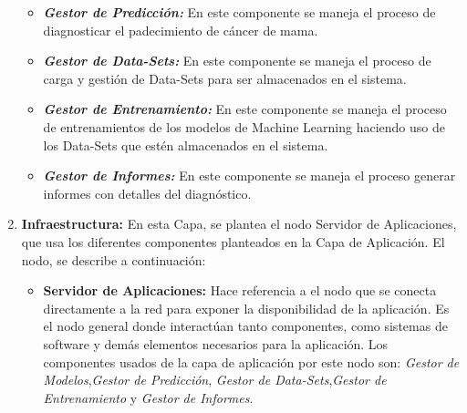\begin{enumerate}[label=\textbf{\arabic*})]
\begin{itemize}
	\item  \textbf{\textit{Gestor de Predicción:}} En este componente se maneja el proceso de diagnosticar el padecimiento de cáncer de mama.
	
	\item  \textbf{\textit{Gestor de Data-Sets:}} En este componente se maneja el proceso de carga  y gestión de Data-Sets para ser almacenados en el sistema.
	
	\item  \textbf{\textit{Gestor de Entrenamiento:}} En este componente se maneja el proceso de entrenamientos de los modelos de Machine Learning haciendo uso de los Data-Sets  que estén almacenados en el sistema.
	
	\item  \textbf{\textit{Gestor de Informes:}} En este componente se maneja el proceso generar informes con detalles del diagnóstico.
\end{itemize}

\item  \textbf{Infraestructura:} En esta Capa, se plantea el nodo Servidor de Aplicaciones, que usa los diferentes componentes planteados en la Capa de Aplicación. El nodo, se describe a continuación:

\begin{itemize}
\item  \textbf{Servidor de Aplicaciones:} Hace referencia a el nodo que se conecta directamente a la red para exponer la disponibilidad de la aplicación. Es el nodo general donde interactúan tanto componentes, como sistemas de software y demás elementos necesarios para la aplicación. Los componentes usados de la capa de aplicación por este nodo son: \textit{Gestor de Modelos},\textit{Gestor de Predicción}, \textit{Gestor de Data-Sets},\textit{Gestor de Entrenamiento} y \textit{Gestor de Informes}.
\end{itemize}
	
\end{enumerate}
